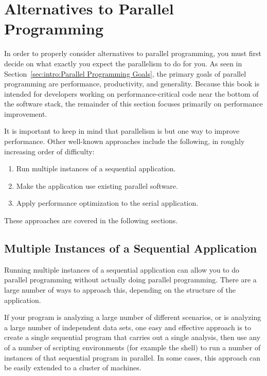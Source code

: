 
\section{Alternatives to Parallel Programming}
\label{sec:intro:Alternatives to Parallel Programming}

In order to properly consider alternatives to parallel programming,
you must first decide on what exactly you expect the parallelism
to do for you.
As seen in Section~\ref{sec:intro:Parallel Programming Goals},
the primary goals of parallel programming are performance, productivity,
and generality.
Because this book is intended for developers working on
performance-critical code near the bottom of the software stack,
the remainder of this section focuses primarily on performance improvement.

It is important to keep in mind that parallelism is but one way to
improve performance.
Other well-known approaches include the following, in roughly increasing
order of difficulty:

\begin{enumerate}
\item	Run multiple instances of a sequential application.
\item	Make the application use existing parallel software.
\item	Apply performance optimization to the serial application.
\end{enumerate}

These approaches are covered in the following sections.

\subsection{Multiple Instances of a Sequential Application}
\label{sec:intro:Multiple Instances of a Sequential Application}

Running multiple instances of a sequential application can allow you
to do parallel programming without actually doing parallel programming.
There are a large number of ways to approach this, depending on the
structure of the application.

If your program is analyzing a large number of different scenarios,
or is analyzing a large number of independent data sets, one easy
and effective approach is to create a single sequential program that
carries out a single analysis, then use any of a number of scripting
environments (for example the  shell) to run a number of
instances of that sequential program in parallel.
In some cases, this approach can be easily extended to a cluster of
machines.

